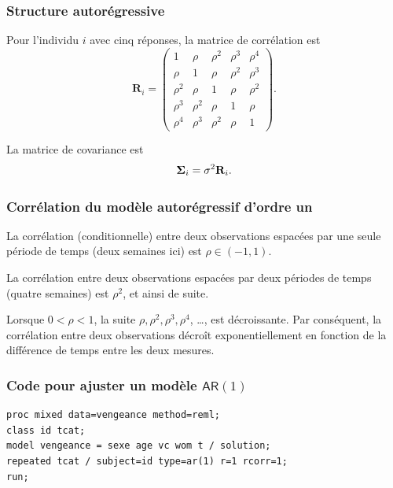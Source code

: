 \documentclass{beamer}
\begin{document}
\begin{frame}
\frametitle{Structure autorégressive}
\bi
\item Pour l'individu $i$ avec cinq réponses, la matrice de corrélation est
\[
\mathbf{R}_i=
  \begin{pmatrix}
   1 & \rho & \rho^2 & \rho^3 & \rho^4\\
    \rho & 1 & \rho & \rho^2 & \rho^3\\
    \rho^2 & \rho & 1 & \rho &  \rho^2\\
       \rho^3 & \rho^2 & \rho & 1 & \rho\\
       \rho^4 & \rho^3 & \rho^2 & \rho & 1
  \end{pmatrix}.
\]
\item La matrice de covariance est
\begin{align*}
\boldsymbol {\Sigma}_i=\sigma^2  \mathbf{R}_i.
\end{align*}
\ei
\end{frame}

\begin{frame}
\frametitle{Corrélation du modèle autorégressif d'ordre un}
\bi
\item La corrélation (conditionnelle) entre deux observations
espacées par une seule période de temps (deux semaines ici) est $\rho \in (-1, 1)$. 
\item La corrélation entre deux observations espacées par deux périodes de temps (quatre
semaines) est $\rho^2$, et ainsi de suite. 
\item Lorsque $0 <\rho<1$, la suite $\rho, \rho^2, \rho^3, \rho^4$, \ldots, 
est décroissante. Par conséquent, la corrélation entre deux observations
décroît exponentiellement en fonction de la différence de temps entre les deux
mesures.
\ei
\end{frame}


\begin{frame}[fragile]
\frametitle{Code \SASlang{} pour ajuster un modèle $\mathsf{AR}(1)$}
\begin{tcolorbox}[colback=white, colframe=hecblue, title=Code \SASlang{} pour ajuster un modèle $\mathsf{AR}(1)$]
\begin{verbatim}
proc mixed data=vengeance method=reml;
class id tcat;
model vengeance = sexe age vc wom t / solution;
repeated tcat / subject=id type=ar(1) r=1 rcorr=1;
run;
\end{verbatim}
\end{tcolorbox}
\end{frame}
\end{document}
